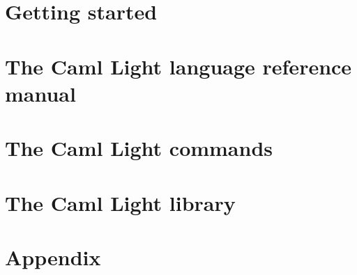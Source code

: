 
\part{Getting started} \label{p:gettingstarted}


\part{The Caml Light language reference manual} \label{p:refman}



\part{The Caml Light commands} \label{p:commands}







\part{The Caml Light library} \label{p:library}







\part{Appendix} \label{p:appendix}

